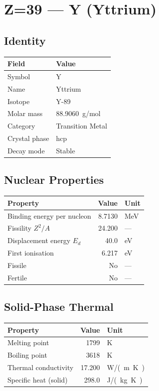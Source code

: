 \documentclass[11pt,a4paper]{article}
\begin{document}
\newpage

\section{Z=39 --- Y (Yttrium)}
\label{sec:Z39}

\subsection{Identity}
\begin{tabular}{ll}
  \toprule
  Field & Value \\
  \midrule
  Symbol & Y \\
  Name & Yttrium \\
  Isotope & Y-89 \\
  Molar mass & \SI{88.9060}{g/mol} \\
  Category & Transition Metal \\
  Crystal phase & hcp \\
  Decay mode & Stable \\
  \bottomrule
\end{tabular}

\subsection{Nuclear Properties}
\begin{tabular}{lrl}
  \toprule
  Property & Value & Unit \\
  \midrule
  Binding energy per nucleon & 8.7130 & \si{MeV} \\
  Fissility $Z^2/A$ & 24.200 & --- \\
  Displacement energy $E_d$ & 40.0 & \si{eV} \\
  First ionisation & 6.217 & \si{eV} \\
  Fissile & No & --- \\
  Fertile & No & --- \\
  \bottomrule
\end{tabular}

\subsection{Solid-Phase Thermal}
\begin{tabular}{lrl}
  \toprule
  Property & Value & Unit \\
  \midrule
  Melting point & 1799 & \si{K} \\
  Boiling point & 3618 & \si{K} \\
  Thermal conductivity & 17.200 & \si{W/(m.K)} \\
  Specific heat (solid) & 298.0 & \si{J/(kg.K)} \\
  \bottomrule
\end{tabular}
\end{document}

